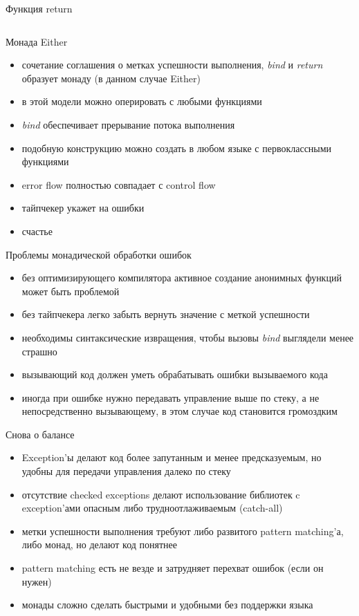 \documentclass[10pt]{beamer}
\newcommand{\code}[4]{\inputminted[linenos, frame=none, firstline=#2, lastline=#3,
  framesep=10pt, bgcolor=lightgray]{#4}{#1}}
\begin{document}
\begin{frame}{Функция return}
  \code{code.py}{88}{93}{python}
\end{frame}

\begin{frame}{Монада Either}
  \begin{itemize}
  \item сочетание соглашения о метках успешности выполнения, \emph{bind} и \emph{return} образует монаду (в данном случае Either)
  \item в этой модели можно оперировать с любыми функциями
  \item \emph{bind} обеспечивает прерывание потока выполнения
  \item подобную конструкцию можно создать в любом языке с первоклассными функциями
  \item error flow полностью совпадает с control flow
  \item тайпчекер укажет на ошибки
  \item счастье
  \end{itemize}
\end{frame}

\begin{frame}{Проблемы монадической обработки ошибок}
  \begin{itemize}
  \item без оптимизирующего компилятора активное создание анонимных функций может быть проблемой
  \item без тайпчекера легко забыть вернуть значение с меткой успешности
  \item необходимы синтаксические извращения, чтобы вызовы \emph{bind} выглядели менее страшно
  \item вызывающий код должен уметь обрабатывать ошибки вызываемого кода
  \item иногда при ошибке нужно передавать управление выше по стеку, а не непосредственно вызывающему, в этом случае код становится громоздким
  \end{itemize}
\end{frame}

\begin{frame}{Снова о балансе}
  \begin{itemize}
  \item Exception'ы делают код более запутанным и менее предсказуемым, но удобны для передачи управления далеко по стеку
  \item отсутствие checked exceptions делают использование библиотек c exception'ами опасным либо трудноотлаживаемым (catch-all)
  \item метки успешности выполнения требуют либо развитого pattern matching'а, либо монад, но делают код понятнее
  \item pattern matching есть не везде и затрудняет перехват ошибок (если он нужен)
  \item монады сложно сделать быстрыми и удобными без поддержки языка
  \end{itemize}
\end{frame}
\end{document}
